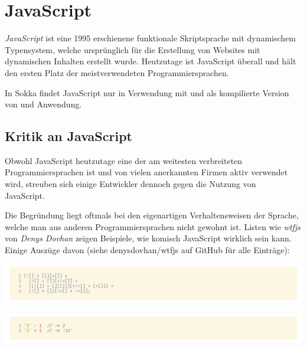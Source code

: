 \section{JavaScript}
\label{javascript}

\textit{JavaScript} ist eine 1995 erschienene funktionale Skriptsprache mit dynamischem Typensystem, welche ursprünglich für die Erstellung von Websites mit dynamischen Inhalten erstellt wurde. Heutzutage ist JavaScript überall und hält den ersten Platz der meistverwendeten Programmiersprachen. \cite{technostacks2021}

In Sokka findet JavaScript nur in Verwendung mit  und als kompilierte Version von  und  Anwendung.

\subsection{Kritik an JavaScript}

Obwohl JavaScript heutzutage eine der am weitesten verbreiteten Programmiersprachen ist und von vielen anerkannten Firmen aktiv verwendet wird, streuben sich einige Entwickler dennoch gegen die Nutzung von JavaScript.~\cite{keenetheng2016}

Die Begründung liegt oftmals bei den eigenartigen Verhaltensweisen der Sprache, welche man aus anderen Programmiersprachen nicht gewohnt ist. Listen wie \textit{wtfjs} von \textit{Denys Dovhan} zeigen Beispiele, wie komisch JavaScript wirklich sein kann. Einige Auszüge davon (siehe denysdovhan/wtfjs auf GitHub für alle Einträge): 

\begin{code}[htp]
    \begin{center}
        \includegraphics[width=1\textwidth]{images/JavaScript/fail.png}
        \vspace{-25pt}
        \caption{\glqq fail\grqq\space in JavaScript; diese Art von JavaScript ist auch bekannt als \textit{JSFuck}}
    \end{center}
\end{code}

\begin{code}[htp]
    \begin{center}
        \includegraphics[width=1\textwidth]{images/JavaScript/coercing.png}
        \vspace{-25pt}
        \caption{Lustige Mathematik: Die Typenumwandlung (Coercing) in JavaScript ...}
    \end{center}
\end{code}